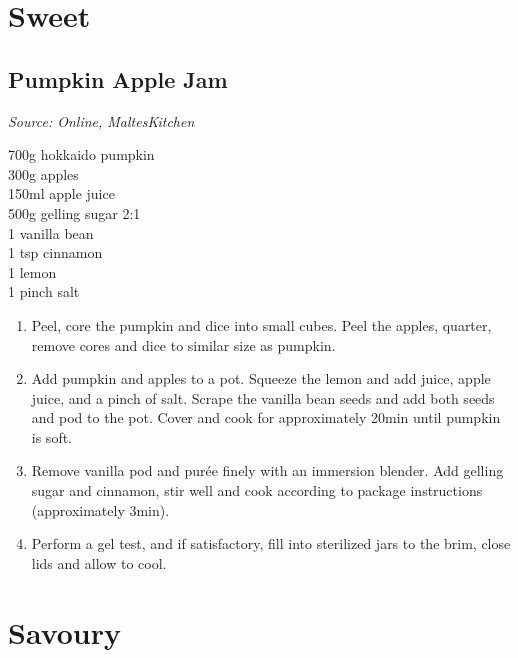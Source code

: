 \documentclass{report}
\begin{document}
\chapter{Sweet}
\section{Pumpkin Apple Jam}
\textit{Source: Online, MaltesKitchen}\\
\begin{minipage}[t]{0.21\textwidth} \vspace{0pt} \raggedright
700g hokkaido pumpkin\\
300g apples\\
150ml apple juice\\
500g gelling sugar 2:1\\
1 vanilla bean\\
1 tsp cinnamon\\
1 lemon\\
1 pinch salt
\end{minipage}
\hfill
\begin{minipage}[t]{0.78\textwidth} \vspace{0pt}
	\begin{enumerate}
		\item Peel, core the pumpkin and dice into small cubes. Peel the apples, quarter, remove cores and dice to similar size as pumpkin.
		\item Add pumpkin and apples to a pot. Squeeze the lemon and add juice, apple juice, and a pinch of salt. Scrape the vanilla bean seeds and add both seeds and pod to the pot. Cover and cook for approximately 20min until pumpkin is soft.
		\item Remove vanilla pod and purée finely with an immersion blender. Add gelling sugar and cinnamon, stir well and cook according to package instructions (approximately 3min).
		\item Perform a gel test, and if satisfactory, fill into sterilized jars to the brim, close lids and allow to cool.
	\end{enumerate}	
\end{minipage}

\chapter{Savoury}
\end{document}
